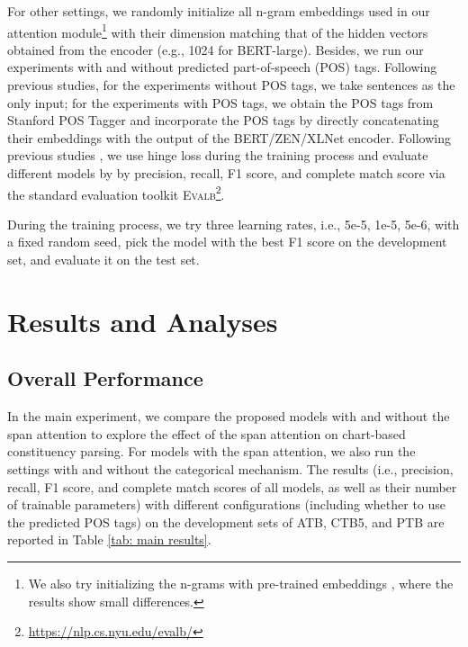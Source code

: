 \documentclass[11pt,a4paper]{article}
\begin{document}
For other settings, we randomly initialize all n-gram embeddings used in our attention module\footnote{We also try initializing the n-grams with pre-trained embeddings \cite{pennington2014glove,song-etal-2018-directional,yamada2020wikipedia2vec}, where the results show small differences.}
with their dimension matching that of the hidden vectors obtained from the encoder (e.g., 1024 for BERT-large).
Besides, we run our experiments with and without predicted part-of-speech (POS) tags.
Following previous studies, for the experiments without POS tags, we take sentences as the only input;
for the experiments with POS tags, we obtain the POS tags from Stanford POS Tagger \cite{toutanova-etal-2003-feature} and incorporate the POS tags by directly concatenating their embeddings with the output of the BERT/ZEN/XLNet encoder.
Following previous studies \cite{suzuki-etal-2018-empirical,kitaev-etal-2019-multilingual}, we use hinge loss during the training process 
and evaluate different models by by precision, recall, F1 score, and complete match score via the standard evaluation toolkit \textsc{Evalb}\footnote{\url{https://nlp.cs.nyu.edu/evalb/}}.



During the training process, we try three learning rates, i.e., 5e-5, 1e-5, 5e-6, with a fixed random seed, pick the model with the best F1 score on the development set, and evaluate it on the test set.








\section{Results and Analyses}

\subsection{Overall Performance}





In the main experiment, we compare the proposed models with and without the span attention to explore the effect of the span attention on chart-based constituency parsing.
For models with the span attention, we also run the settings with and without the categorical mechanism.
The results (i.e., precision, recall, F1 score, and complete match scores of all models, as well as their number of trainable parameters) 
with different configurations (including whether to use the predicted POS tags) on the development sets of ATB, CTB5, and PTB are reported in Table \ref{tab: main results}.
\end{document}
